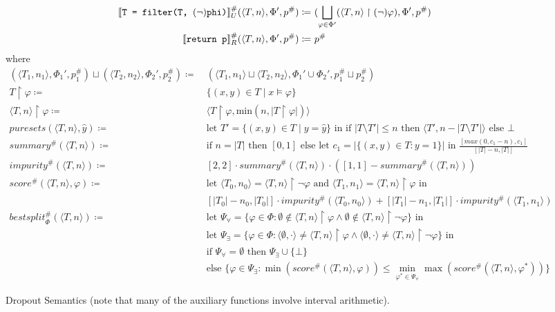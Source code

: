 \begin{figure}
\begin{align*}
%
\den[U]{\filternode[(\lnot)]}^\#(\argtuple) \coloneqq&~
(\bigsqcup_{\varphi \in \Phi'} (\langle T, n \rangle \upharpoonright (\lnot) \varphi), \Phi', p^\#) \\
%
\den[R]{\returnnode}^\#(\argtuple) \coloneqq&~ p^\#
\end{align*}
where
\begin{align*}
(\langle T_1, n_1 \rangle, \Phi_1', p_1^\#) \sqcup (\langle T_2, n_2 \rangle, \Phi_2', p_2^\#)
\coloneqq&~
(\langle T_1, n_1 \rangle \sqcup \langle T_2, n_2 \rangle,
\Phi_1' \cup \Phi_2', p_1^\# \sqcup p_2^\#) \\
%
T \upharpoonright \varphi \coloneqq&~ \{(x,y) \in T \mid x \models \varphi\} \\
%
\langle T, n \rangle \upharpoonright \varphi \coloneqq&~
\langle T \upharpoonright \varphi, \text{min}(n, |T \upharpoonright \varphi|) \rangle \\
%
\mathit{puresets}(\langle T, n\rangle, \hat{y}) \coloneqq&~
\text{let } T' = \{(x,y) \in T \mid y = \hat{y}\} \text{ in }
\text{if } |T \setminus T'| \leq n \text{ then } \langle T', n - |T \setminus T'| \rangle
\text{ else } \bot \\
%
\mathit{summary}^\#(\langle T, n \rangle) \coloneqq&~
\text{if } n = |T| \text{ then } [0, 1] \text{ else }
\text{let } c_1 = |\{(x,y) \in T : y = 1\}| \text{ in }
\frac{[max(0, c_1 - n), c_1]}{[|T| - n, |T|]}\\
%
\mathit{impurity}^\#(\langle T, n \rangle) \coloneqq&~
[2,2] \cdot \mathit{summary^\#(\langle T, n \rangle)}
\cdot ([1,1] - summary^\#(\langle T, n \rangle)) \\
%
\mathit{score}^\#(\langle T, n \rangle, \varphi) \coloneqq&~
\text{let } \langle T_0, n_0 \rangle = \langle T, n \rangle \upharpoonright \lnot \varphi
\text{ and } \langle T_1, n_1 \rangle = \langle T, n \rangle \upharpoonright \varphi \text{ in } \\
&~[|T_0| - n_0, |T_0|] \cdot \mathit{impurity}^\#(\langle T_0, n_0 \rangle) +
[|T_1| - n_1, |T_1|] \cdot \mathit{impurity}^\#(\langle T_1, n_1 \rangle)\\
%
\mathit{bestsplit}^\#_\Phi(\langle T, n \rangle) \coloneqq&~
\text{let } \Psi_\forall = \{\varphi \in \Phi : \emptyset \not \in \langle T, n \rangle \upharpoonright \varphi
\land \emptyset \not \in \langle T, n \rangle \upharpoonright \lnot\varphi\} \text{ in } \\
&~\text{let } \Psi_\exists = \{\varphi \in \Phi :
\langle \emptyset, \cdot \rangle \neq \langle T, n \rangle \upharpoonright \varphi \land
\langle \emptyset, \cdot \rangle \neq \langle T, n \rangle \upharpoonright \lnot \varphi \} \text{ in } \\
&~\text{if } \Psi_\forall = \emptyset \text{ then } \Psi_\exists \cup \{\bot\} \\
&~\text{else } \{\varphi \in \Psi_\exists : \min(\mathit{score}^\#(\langle T, n \rangle, \varphi))
\leq \min_{\varphi^* \in \Psi_\forall} \max(\mathit{score}^\#(\langle T, n \rangle, \varphi^*))\}
\end{align*}
\caption{Dropout Semantics (note that many of the auxiliary functions involve interval arithmetic).}
\label{fig:abstract}
\end{figure}


